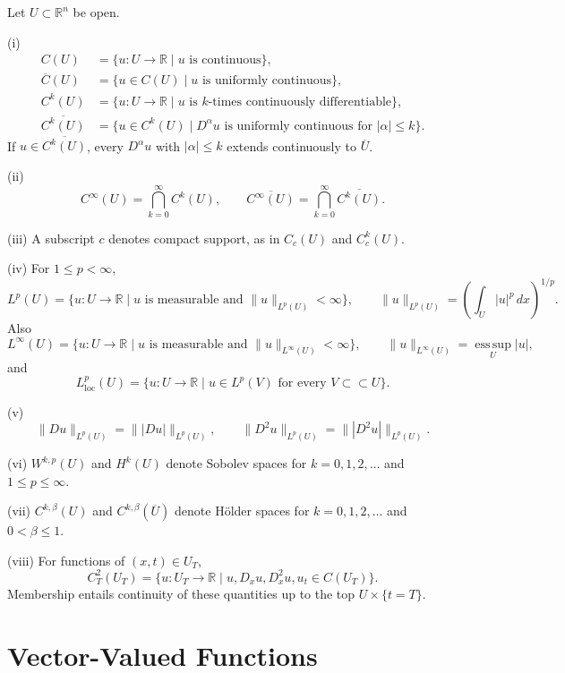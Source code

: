 \begin{definition}
\label{def:function-space-notation}
Let $U\subset\mathbb R^n$ be open.

(i)
\[
\begin{aligned}
C(U)&=\{u:U\to\mathbb R\mid u\text{ is continuous}\},\\
\overline C(U)&=\{u\in C(U)\mid u\text{ is uniformly continuous}\},\\
C^k(U)&=\{u:U\to\mathbb R\mid u\text{ is }k\text{-times continuously differentiable}\},\\
\overline{C^k(U)}&=\{u\in C^k(U)\mid D^\alpha u\text{ is uniformly continuous for }|\alpha|\leq k\}.
\end{aligned}
\]
If $u\in\overline{C^k(U)}$, every $D^\alpha u$ with $|\alpha|\leq k$ extends continuously to $\overline U$.

(ii)
\[
C^\infty(U)=\bigcap_{k=0}^\infty C^k(U),
\qquad
\overline{C^\infty(U)}=\bigcap_{k=0}^\infty\overline{C^k(U)}.
\]

(iii) A subscript $c$ denotes compact support, as in $C_c(U)$ and $C_c^k(U)$.

(iv) For $1\leq p<\infty$,
\[
L^p(U)=\{u:U\to\mathbb R\mid u\text{ is measurable and }\|u\|_{L^p(U)}<\infty\},
\qquad
\|u\|_{L^p(U)}=\left(\int_U|u|^p\,dx\right)^{1/p}.
\]
Also
\[
L^\infty(U)=\{u:U\to\mathbb R\mid u\text{ is measurable and }\|u\|_{L^\infty(U)}<\infty\},
\qquad
\|u\|_{L^\infty(U)}=\operatorname*{ess\,sup}_U|u|,
\]
and
\[
L^p_{\mathrm{loc}}(U)=\{u:U\to\mathbb R\mid u\in L^p(V)\text{ for every }V\subset\subset U\}.
\]

(v)
\[
\|Du\|_{L^p(U)}=\||Du|\|_{L^p(U)},
\qquad
\|D^2u\|_{L^p(U)}=\||D^2u|\|_{L^p(U)}.
\]

(vi) $W^{k,p}(U)$ and $H^k(U)$ denote Sobolev spaces for $k=0,1,2,\ldots$ and $1\leq p\leq\infty$.

(vii) $C^{k,\beta}(U)$ and $C^{k,\beta}(\overline U)$ denote H\"older spaces for $k=0,1,2,\ldots$ and $0<\beta\leq1$.

(viii) For functions of $(x,t)\in U_T$,
\[
C_T^2(U_T)=\{u:U_T\to\mathbb R
\mid u,D_xu,D_x^2u,u_t\in C(U_T)\}.
\]
Membership entails continuity of these quantities up to the top $U\times\{t=T\}$.
\end{definition}

\section{Vector-Valued Functions}
\label{sec:vector-valued-functions}

